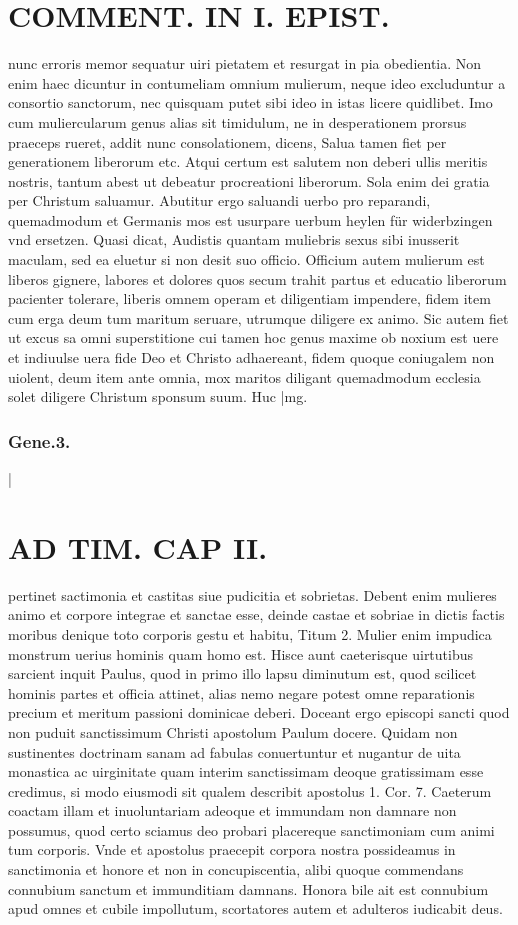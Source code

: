 \documentclass{article}
\begin{document}
\begin{pages}
\section*{COMMENT. IN I. EPIST. }\pstart nunc erroris memor sequatur uiri pietatem et resurgat in pia obedientia. Non enim haec dicuntur in contumeliam omnium mulierum, neque ideo excluduntur a consortio sanctorum, nec quisquam putet sibi ideo in istas licere quidlibet. Imo cum muliercularum genus alias sit timidulum, ne in desperationem prorsus praeceps rueret, addit nunc consolationem, dicens, Salua tamen fiet per generationem liberorum etc. Atqui certum est salutem non deberi ullis meritis nostris, tantum abest ut debeatur procreationi liberorum. Sola enim dei gratia per Christum saluamur. Abutitur ergo saluandi uerbo pro reparandi, quemadmodum et Germanis mos est usurpare uerbum heylen für widerbzingen vnd ersetzen. Quasi dicat, Audistis quantam muliebris sexus sibi inusserit maculam, sed ea eluetur si non desit suo officio. Officium autem mulierum est liberos gignere, labores et dolores quos secum trahit partus et educatio liberorum pacienter tolerare, liberis omnem operam et diligentiam impendere, fidem item cum erga deum tum maritum seruare, utrumque diligere ex animo. Sic autem fiet ut excus sa omni superstitione cui tamen hoc genus maxime ob noxium est uere et indiuulse uera fide Deo et Christo adhaereant, fidem quoque coniugalem non uiolent, deum item ante omnia, mox maritos diligant quemadmodum ecclesia solet diligere Christum sponsum suum. Huc  \pend
|mg. \subsubsection*{Gene.3. }|
\section*{AD TIM. CAP II. }
\marginpar{[ p.122 ]}\pstart pertinet sactimonia et castitas siue pudicitia et sobrietas. Debent enim mulieres animo et corpore integrae et sanctae esse, deinde castae et sobriae in dictis factis moribus denique toto corporis gestu et habitu, Titum 2. Mulier enim impudica monstrum uerius hominis quam homo est. Hisce aunt caeterisque uirtutibus sarcient inquit Paulus, quod in primo illo lapsu diminutum est, quod scilicet hominis partes et officia attinet, alias nemo negare potest omne reparationis precium et meritum passioni dominicae deberi. Doceant ergo episcopi sancti quod non puduit sanctissimum Christi apostolum Paulum docere. Quidam non sustinentes doctrinam sanam ad fabulas conuertuntur et nugantur de uita monastica ac uirginitate quam interim sanctissimam deoque gratissimam esse credimus, si modo eiusmodi sit qualem describit apostolus 1. Cor. 7. Caeterum coactam illam et inuoluntariam adeoque et immundam non damnare non possumus, quod certo sciamus deo probari placereque sanctimoniam cum animi tum corporis. Vnde et apostolus praecepit corpora nostra possideamus in sanctimonia et honore et non in concupiscentia, alibi quoque commendans connubium sanctum et immunditiam damnans. Honora bile ait est connubium apud omnes et cubile impollutum, scortatores autem et adulteros iudicabit deus.  \pend
{}
{}

\end{pages}
\end{document}
